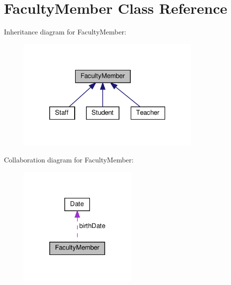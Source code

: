 \hypertarget{classFacultyMember}{}\section{Faculty\+Member Class Reference}
\label{classFacultyMember}


Inheritance diagram for Faculty\+Member\+:\nopagebreak
\begin{figure}[H]
\begin{center}
\leavevmode
\includegraphics[width=256pt]{classFacultyMember__inherit__graph}
\end{center}
\end{figure}


Collaboration diagram for Faculty\+Member\+:\nopagebreak
\begin{figure}[H]
\begin{center}
\leavevmode
\includegraphics[width=165pt]{classFacultyMember__coll__graph}
\end{center}
\end{figure}
